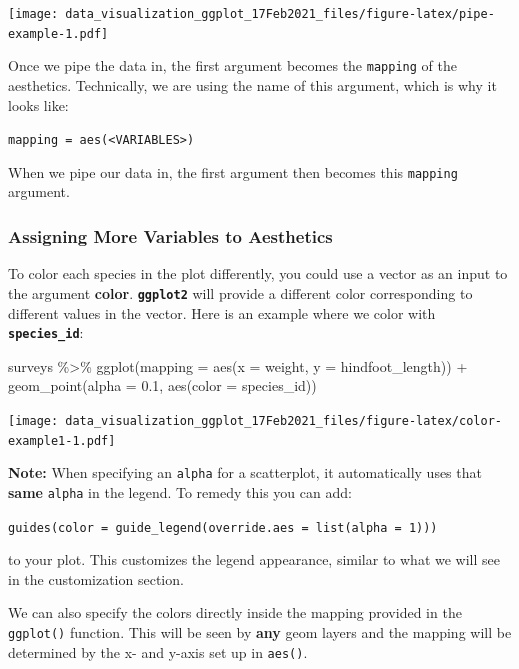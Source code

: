 \documentclass[
]{article}
\newenvironment{Shaded}{\begin{snugshade}}{\end{snugshade}}
\newcommand{\AttributeTok}[1]{\textcolor[rgb]{0.77,0.63,0.00}{#1}}
\newcommand{\FloatTok}[1]{\textcolor[rgb]{0.00,0.00,0.81}{#1}}
\newcommand{\FunctionTok}[1]{\textcolor[rgb]{0.00,0.00,0.00}{#1}}
\newcommand{\NormalTok}[1]{#1}
\newcommand{\SpecialCharTok}[1]{\textcolor[rgb]{0.00,0.00,0.00}{#1}}
\begin{document}
\texttt{[image: data\_visualization\_ggplot\_17Feb2021\_files/figure-latex/pipe-example-1.pdf]}

Once we pipe the data in, the first argument becomes the
\texttt{mapping} of the aesthetics. Technically, we are using the name
of this argument, which is why it looks like:

\texttt{mapping\ =\ aes(\textless{}VARIABLES\textgreater{})}

When we pipe our data in, the first argument then becomes this
\texttt{mapping} argument.

\hypertarget{assigning-more-variables-to-aesthetics}{%
\subsubsection{Assigning More Variables to
Aesthetics}\label{assigning-more-variables-to-aesthetics}}

To color each species in the plot differently, you could use a vector as
an input to the argument \textbf{color}. \textbf{\texttt{ggplot2}} will
provide a different color corresponding to different values in the
vector. Here is an example where we color with
\textbf{\texttt{species\_id}}:

\begin{Shaded}
\begin{Highlighting}[]
\NormalTok{surveys }\SpecialCharTok{\%\textgreater{}\%} 
  \FunctionTok{ggplot}\NormalTok{(}\AttributeTok{mapping =} \FunctionTok{aes}\NormalTok{(}\AttributeTok{x =}\NormalTok{ weight, }\AttributeTok{y =}\NormalTok{ hindfoot\_length)) }\SpecialCharTok{+}
  \FunctionTok{geom\_point}\NormalTok{(}\AttributeTok{alpha =} \FloatTok{0.1}\NormalTok{, }\FunctionTok{aes}\NormalTok{(}\AttributeTok{color =}\NormalTok{ species\_id)) }
\end{Highlighting}
\end{Shaded}

\texttt{[image: data\_visualization\_ggplot\_17Feb2021\_files/figure-latex/color-example1-1.pdf]}

\textbf{Note:} When specifying an \texttt{alpha} for a scatterplot, it
automatically uses that \textbf{same} \texttt{alpha} in the legend. To
remedy this you can add:

\texttt{guides(color\ =\ guide\_legend(override.aes\ =\ list(alpha\ =\ 1)))}

to your plot. This customizes the legend appearance, similar to what we
will see in the customization section.

We can also specify the colors directly inside the mapping provided in
the \texttt{ggplot()} function. This will be seen by \textbf{any} geom
layers and the mapping will be determined by the x- and y-axis set up in
\texttt{aes()}.
\end{document}
